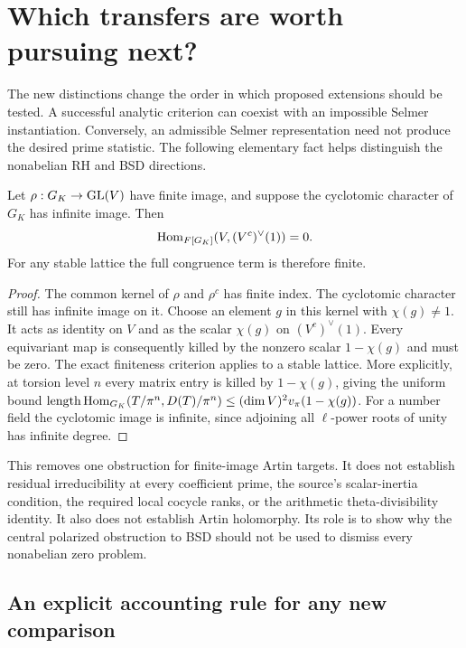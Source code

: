 \section{Which transfers are worth pursuing next?}
\label{sec:programme}

The new distinctions change the order in which proposed extensions should
be tested. A successful analytic criterion can coexist with an impossible
Selmer instantiation. Conversely, an admissible Selmer representation need
not produce the desired prime statistic. The following elementary fact
helps distinguish the nonabelian RH and BSD directions.

\begin{proposition}
Let $\rho:G_K\to\operatorname{GL}(V)$ have finite image, and suppose the cyclotomic
character of $G_K$ has infinite image. Then
\[
 \operatorname{Hom}_{F[G_K]}(V,(V^c)^\vee(1))=0.
\]
For any stable lattice the full congruence term is therefore finite.
\end{proposition}
\begin{proof}
The common kernel of $\rho$ and $\rho^c$ has finite index. The cyclotomic
character still has infinite image on it. Choose an element $g$ in this
kernel with $\chi(g)\ne1$. It acts as identity on $V$ and as the scalar
$\chi(g)$ on $(V^c)^\vee(1)$. Every equivariant map is consequently killed
by the nonzero scalar $1-\chi(g)$ and must be zero. The exact finiteness
criterion applies to a stable lattice. More explicitly, at torsion level
$n$ every matrix entry is killed by $1-\chi(g)$, giving the uniform bound
$\operatorname{length}\operatorname{Hom}_{G_K}(T/\pi^n,D(T)/\pi^n)\le(\dim V)^2v_\pi(1-\chi(g))$.
For a number field the cyclotomic image is infinite, since adjoining all
$\ell$-power roots of unity has infinite degree.
\end{proof}

This removes one obstruction for finite-image Artin targets. It does not
establish residual irreducibility at every coefficient prime, the source's
scalar-inertia condition, the required local cocycle ranks, or the
arithmetic theta-divisibility identity. It also does not establish Artin
holomorphy. Its role is to show why the central polarized obstruction to
BSD should not be used to dismiss every nonabelian zero problem.

\subsection{An explicit accounting rule for any new comparison}

